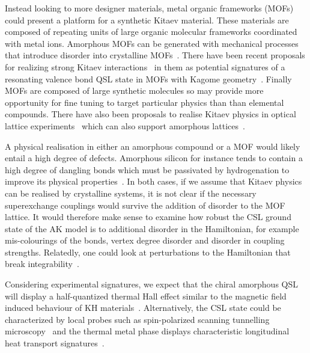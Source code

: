 Instead looking to more designer materials, metal organic frameworks (MOFs) could present a platform for a synthetic Kitaev material. These materials are composed of repeating units of large organic molecular frameworks coordinated with metal ions. Amorphous MOFs can be generated with mechanical processes that introduce disorder into crystalline MOFs~\autocite{bennett2014amorphous}. There have been recent proposals for realizing strong Kitaev interactions~\autocite{yamadaDesigningKitaevSpin2017} in them as potential signatures of a resonating valence bond QSL state in MOFs with Kagome geometry~\autocite{misumiQuantumSpinLiquid2020}. Finally MOFs are composed of large synthetic molecules so may provide more opportunity for fine tuning to target particular physics than than elemental compounds. There have also been proposals to realise Kitaev physics in optical lattice experiments~\autocite{duanControllingSpinExchange2003,micheliToolboxLatticespinModels2006} which can also support amorphous lattices~\autocite{sadeghiAmorphousTwodimensionalOptical2005}.

A physical realisation in either an amorphous compound or a MOF would likely entail a high degree of defects. Amorphous silicon for instance tends to contain a high degree of dangling bonds which must be passivated by hydrogenation to improve its physical properties~\autocite{streetHydrogenatedAmorphousSilicon1991}. In both cases, if we assume that Kitaev physics can be realised by crystalline systems, it is not clear if the necessary superexchange couplings would survive the addition of disorder to the MOF lattice. It would therefore make sense to examine how robust the CSL ground state of the AK model is to additional disorder in the Hamiltonian, for example mis-colourings of the bonds, vertex degree disorder and disorder in coupling strengths. Relatedly, one could look at perturbations to the Hamiltonian that break integrability~\autocite{Rau2014,Chaloupka2010,Chaloupka2013,Chaloupka2015,Winter2016}.

Considering experimental signatures, we expect that the chiral amorphous QSL will display a half-quantized thermal Hall effect similar to the magnetic field induced behaviour of KH materials~\autocite{Kasahara2018,Yokoi2021,Yamashita2020,Bruin2022}. Alternatively, the CSL state could be characterized by local probes such as spin-polarized scanning tunnelling microscopy~\autocite{Feldmeier2020,Konig2020,Udagawa2021} and the thermal metal phase displays characteristic longitudinal heat transport signatures~\autocite{Beenakker2013}.

